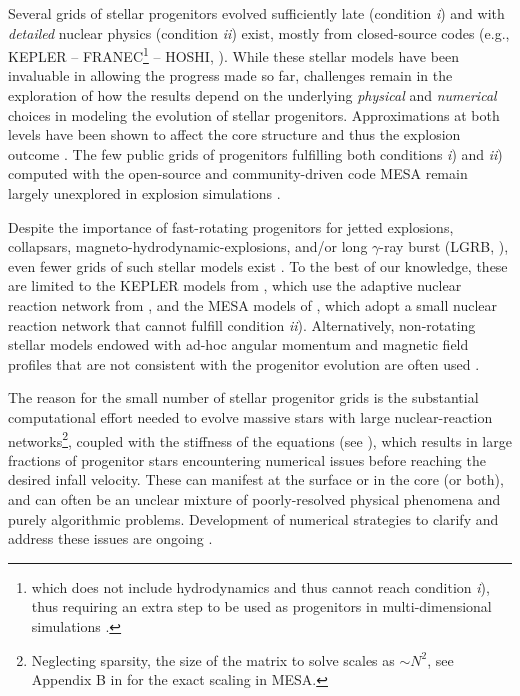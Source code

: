 \documentclass[%
trackchanges,twocolumn]{aastex701}
\begin{document}
Several grids of stellar progenitors evolved sufficiently late
(condition \emph{i}) and with \emph{detailed} nuclear physics
(condition \emph{ii}) exist, mostly from closed-source codes (e.g.,
\textsc{KEPLER} \citealt{weaver:78, woosley:02, sukhbold:16,
  sukhbold:18} -- \textsc{FRANEC}\footnote{which does not include
  hydrodynamics and thus cannot reach condition \emph{i}), thus
  requiring an extra step to be used as progenitors in
  multi-dimensional simulations
  \citep[e.g.,][]{oconnor:10,limongi:20}.} \citealt{limongi:03,
  chieffi:13, limongi:18, limongi:24, limongi:25} -- \textsc{HOSHI}, \citealt{takahashi:13}). While these
stellar models have been invaluable in allowing the progress made so
far, challenges remain in the exploration of how the results depend on
the underlying \emph{physical} and \emph{numerical} choices in
modeling the evolution of stellar progenitors. Approximations at both
levels have been shown to affect the core structure and thus the
explosion outcome \citep[e.g.,][]{farmer:16, renzo:17, davis:19,
  laplace:21, farmer:21, farmer:23, maltsev:25, myers:26}. The few
public grids of progenitors fulfilling both conditions \emph{i}) and
\emph{ii}) computed with the open-source and community-driven code
\textsc{MESA} \citep[e.g.,][]{farmer:16, renzo:17, farag:20,
  laplace:21, farmer:21, farmer:23, myers:26} remain largely
unexplored in explosion simulations \citep[see
however][]{perna:18, vartanyan:21, gottlieb:24, chan:26}.

Despite the importance of fast-rotating progenitors for jetted
explosions, collapsars, magneto-hydrodynamic-explosions, and/or long
$\gamma$-ray burst (LGRB,
\citealt{woosley:93,macfadyen:94,gottlieb:25b}), even fewer grids of
such stellar models exist
\cite[e.g.,][]{heger:05,hirschi:04,hirschi:05,hirschi:05b,hirschi:05c}. To the best of our knowledge, these are
limited to the \textsc{KEPLER} models from \cite{woosley:06}, which
use the adaptive nuclear reaction network from \cite{heger:00}, and
the \textsc{MESA} models of \cite{aguilera-dena:18, aguilera-dena:20},
which adopt a small nuclear reaction network that cannot fulfill
condition \emph{ii}). Alternatively, non-rotating stellar models
endowed with ad-hoc angular momentum and magnetic field profiles that
are not consistent with the progenitor evolution are often used
\cite[e.g.,][]{siegel:22, gottlieb:25}.

The reason for the small number of stellar progenitor grids is the
substantial computational effort needed to evolve massive stars with large
nuclear-reaction networks\footnote{Neglecting sparsity, the size of the matrix to solve
  scales as $\sim{}N^{2}$, see Appendix B in \citealt{renzo:17} for
  the exact scaling in \textsc{MESA}.}, coupled with the stiffness of
the equations (see \citealt{grichener:25}), which results in large
fractions of progenitor stars encountering numerical issues before
reaching the desired infall velocity. These can manifest at the
surface or in the core (or both), and can often be an unclear mixture of
poorly-resolved physical phenomena and purely algorithmic problems.
Development of numerical strategies to clarify and address these issues are
ongoing \citep[e.g.,][]{paxton:13, jermyn:23,
  grichener:25,griffiths:25}.
\end{document}
